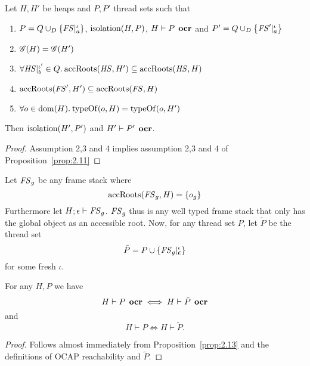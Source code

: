 \begin{corollary} \label{cor:2.11}
  Let $H, H'$ be heaps and $P, P'$ thread sets such that
  \begin{enumerate}
    \item $P = Q \cup_D \left\{ \mathit{FS}|_a^\iota \right\}$, $\mbox{$\mathrm{isolation}$}{(H, P)}$, $H
      \vdash P \:\: \mbox{\bf ocr}$ and $P' = Q \cup_D \left\{ \mathit{FS}'|_a^\iota \right\}$
    \item $\mathscr{G}{(H)} = \mathscr{G}{(H')}$
    \item $\forall \mathit{HS}|_b^{\iota'} \in Q. \: \mbox{$\mathrm{accRoots}$}{(\ensuremath{\mathit{HS}}, H')} \subseteq \mbox{$\mathrm{accRoots}$}{(\ensuremath{\mathit{HS}}, H)}$
    \item $\mbox{$\mathrm{accRoots}$}{(\ensuremath{\mathit{FS}}', H')} \subseteq \mbox{$\mathrm{accRoots}$}{(\ensuremath{\mathit{FS}}, H)}$
    \item $\forall o \in \mbox{$\mathrm{dom}$}{(H)}. \: \mbox{$\mathrm{typeOf}$}{(o, H)} = \mbox{$\mathrm{typeOf}$}{(o, H')}$
  \end{enumerate}
  Then $\mbox{$\mathrm{isolation}$}{(H', P')}$ and $H' \vdash P' \:\: \mbox{\bf ocr}$.
\end{corollary}

\begin{proof}
  Assumption 2,3 and 4 implies assumption 2,3 and 4 of
  Proposition~\ref{prop:2.11}
\end{proof}

\begin{definition} \label{def:ptilde}
  Let $\mathit{FS}_g$ be any frame stack where 
  \begin{equation*}
    \mbox{$\mathrm{accRoots}$}(\mathit{FS}_g, H) = \left\{ o_g \right\}
  \end{equation*}
  Furthermore let $H; \mbox{$\epsilon$} \vdash \mathit{FS}_g$.
  $\mathit{FS}_g$ thus is any well typed frame stack that only has the global object as
  an accessible root.  Now, for any thread set $P$, let $\tilde{P}$ be the
  thread set
  \begin{equation*}
    \tilde{P} = P \cup \left\{ \mathit{FS}_g|_{\mbox{$\epsilon$}}^\iota \right\}
  \end{equation*}
  for some fresh $\iota$.
\end{definition}

\begin{proposition} \label{prop:ocrtilde_eq}
  For any $H, P$ we have
  \begin{equation*}
    H \vdash P \:\: \mbox{\bf ocr} \iff H \vdash \tilde{P} \:\: \mbox{\bf ocr}
  \end{equation*}
  and
  \begin{equation*}
    H \vdash P  \iff H \vdash \tilde{P}. 
  \end{equation*}
\end{proposition}
\begin{proof}
  Follows almost immediately from Proposition~\ref{prop:2.13} and the
  definitions of OCAP reachability and $\tilde{P}$.
\end{proof}

